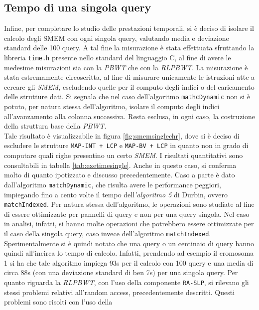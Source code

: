 \subsection{Tempo di una singola query}
Infine, per completare lo studio delle prestazioni temporali, si è deciso di
isolare il calcolo degli SMEM con ogni singola query, valutando media e
deviazione standard delle 100 query. A tal fine la misurazione è stata
effettuata sfruttando la libreria \texttt{time.h} presente nello standard del
linguaggio C, al fine di avere le medesime misurazioni sia con la \textit{PBWT}
che con la \textit{RLPBWT}. La misurazione è stata estremamente circoscritta, al
fine di misurare unicamente le istruzioni atte a cercare gli \textit{SMEM},
escludendo quelle per il computo degli indici o del caricamento delle strutture
dati.
Si segnala che nel caso dell'algoritmo \texttt{mathcDynamic} non si è
potuto, per natura stessa dell'algoritmo, isolare il computo degli indici
all'avanzamento alla colonna successiva. Resta esclusa, in ogni caso, la
costruzione della struttura base della \textit{PBWT}.
\\
Tale risultato è visualizzabile in figura
\ref{fig:smemsinglechr}, dove si è deciso di escludere le strutture
\texttt{MAP-INT + LCP} e \texttt{MAP-BV + LCP} in quanto non in grado di
computare quali righe presentino un certo \textit{SMEM}. I risultati
quantitativi sono consultabili in tabella \ref{tab:exetimesingle}. Anche in
questo caso, 
si conferma molto di quanto ipotizzato e discusso precedentemente. Caso a parte
è dato dall'algoritmo \texttt{matchDynamic}, che risulta avere le performance
peggiori, impiegando fino a cento volte il tempo dell\textit{'algoritmo 5} di
Durbin, ovvero \texttt{matchIndexed}. Per natura stessa dell'algoritmo, 
le operazioni sono studiate al fine di essere ottimizzate per pannelli di query
e non per una query singola. Nel caso in analisi, infatti, si hanno molte
operazioni che potrebbero essere ottimizzate per il caso della singola
query, caso invece dell'algoritmo \texttt{matchIndexed}. Sperimentalmente si è
quindi notato che una query o un centinaio di query hanno quindi all'incirca lo
tempo di calcolo. Infatti, prendendo ad esempio il cromosoma 1 si ha che tale
algoritmo impiega 93s per il calcolo con 100 query e una media di circa 88s (con
una deviazione standard di ben 7s) per
una singola query. Per quanto riguarda la \textit{RLPBWT}, con l'uso della
componente \texttt{RA-SLP}, si rilevano gli stessi problemi relativi all'random
access, precedentemente descritti. Questi problemi sono risolti con l'uso della
